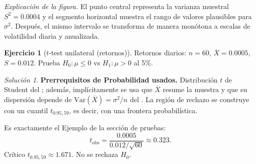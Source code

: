 \documentclass[11pt]{article}
\theoremstyle{plain}
\theoremstyle{definition}
\newtheorem{exercise}[theorem]{Ejercicio}
\theoremstyle{remark}
\theoremstyle{solstyle}
\newtheorem*{solution}{Solución}
\newcommand{\Var}{\mathrm{Var}}
\newcommand{\1}{\mathbbm{1}}
\newcommand{\Xbar}{\overline{X}}
\begin{document}
\begin{center}
\end{center}

\noindent\textit{Explicación de la figura.} El punto central representa la varianza muestral $S^2=0.0004$ y el segmento horizontal muestra el rango de valores plausibles para $\sigma^2$. Después, el mismo intervalo se transforma de manera monótona a escalas de volatilidad diaria y anualizada.

\begin{exercise}[$t$-test unilateral (retornos)]\label{ex:ex3}
Retornos diarios: $n=60$, $\Xbar=0.0005$, $S=0.012$.
Prueba $H_0:\mu\le 0$ vs $H_1:\mu>0$ al 5\%.
\end{exercise}

\begin{solution}
\textbf{Prerrequisitos de Probabilidad usados.}
Distribución $t$ de Student del ; además, implícitamente se usa que $\Xbar$ resume la muestra
y que su dispersión depende de $\Var(\Xbar)=\sigma^2/n$ del .
La región de rechazo se construye con un cuantil $t_{0.95,59}$, es decir, con una frontera probabilística.

Es exactamente el Ejemplo de la sección de pruebas:
\[
t_{\text{obs}}=\frac{0.0005}{0.012/\sqrt{60}}\approx 0.323.
\]
Crítico $t_{0.95,59}\approx 1.671$.
No se rechaza $H_0$.
\end{solution}
\end{document}
